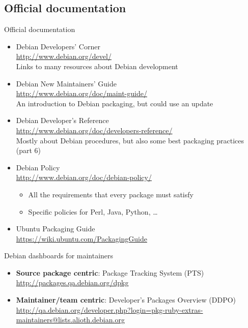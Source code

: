 \documentclass[10pt,final]{beamer}
\begin{document}
\subsection{Official documentation}
\begin{frame}{Official documentation}
  \begin{itemize}
  \item Debian Developers' Corner\\
    \url{http://www.debian.org/devel/}\\
    {\small Links to many resources about Debian development}
    \hbr
  \item Debian New Maintainers' Guide\\
    \url{http://www.debian.org/doc/maint-guide/}\\
    {\small An introduction to Debian packaging, but could use an update}
    \hbr
  \item Debian Developer's Reference\\
    \url{http://www.debian.org/doc/developers-reference/}\\
    {\small Mostly about Debian procedures, but also some best packaging practices (part 6)}
    \hbr
  \item Debian Policy\\
    \url{http://www.debian.org/doc/debian-policy/}\\
    
    {\small \begin{itemize}
      \item \small All the requirements that every package must satisfy
      \item \small Specific policies for Perl, Java, Python, \ldots
      \end{itemize}}
    \hbr
    
  \item Ubuntu Packaging Guide\\
    \url{https://wiki.ubuntu.com/PackagingGuide}
  \end{itemize}
\end{frame}

\begin{frame}{Debian dashboards for maintainers}
  \begin{itemize}
	  \item \textbf{Source package centric}: Package Tracking System (PTS)\\
    \url{http://packages.qa.debian.org/dpkg}
    \br
  \item \textbf{Maintainer/team centric}: Developer's Packages Overview (DDPO)\\
    \url{http://qa.debian.org/developer.php?login=pkg-ruby-extras-maintainers@lists.alioth.debian.org}
  \end{itemize}
\end{frame}
\end{document}
